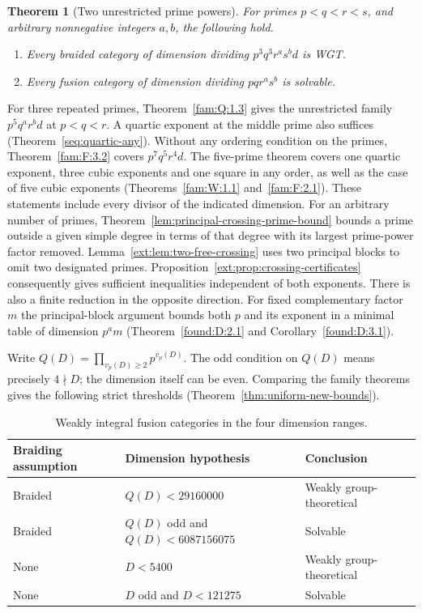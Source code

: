 \documentclass[11pt,a4paper]{article}
\numberwithin{equation}{section}
\newtheorem{theorem}{Theorem}[section]
\theoremstyle{remark}
\begin{document}
\begin{theorem}[Two unrestricted prime powers]\label{thm:intro-two-free}\label{fam:M:1.1}
For primes $p<q<r<s$, and arbitrary nonnegative integers $a,b$, the following hold.
\begin{enumerate}[label=\textup{(\roman*)},leftmargin=*,nosep]
\item Every braided category of dimension dividing $p^3q^3r^as^bd$ is WGT.
\item Every fusion category of dimension dividing $pqr^as^b$ is solvable.
\end{enumerate}
\end{theorem}
For three repeated primes, Theorem~\ref{fam:Q:1.3} gives the unrestricted family $p^5q^a r^bd$ at $p<q<r$. A quartic exponent at the middle prime also suffices (Theorem~\ref{seq:quartic-any}). Without any ordering condition on the primes, Theorem~\ref{fam:F:3.2} covers $p^7q^5r^4d$. The five-prime theorem covers one quartic exponent, three cubic exponents and one square in any order, as well as the case of five cubic exponents (Theorems~\ref{fam:W:1.1} and~\ref{fam:F:2.1}). These statements include every divisor of the indicated dimension. For an arbitrary number of primes, Theorem~\ref{lem:principal-crossing-prime-bound} bounds a prime outside a given simple degree in terms of that degree with its largest prime-power factor removed. Lemma~\ref{ext:lem:two-free-crossing} uses two principal blocks to omit two designated primes. Proposition~\ref{ext:prop:crossing-certificates} consequently gives sufficient inequalities independent of both exponents. There is also a finite reduction in the opposite direction. For fixed complementary factor $m$ the principal-block argument bounds both $p$ and its exponent in a minimal table of dimension $p^a m$ (Theorem~\ref{found:D:2.1} and Corollary~\ref{found:D:3.1}).

Write $Q(D)=\prod_{v_p(D)\ge2}p^{v_p(D)}$. The odd condition on $Q(D)$ means precisely $4\nmid D$; the dimension itself can be even. Comparing the family theorems gives the following strict thresholds (Theorem~\ref{thm:uniform-new-bounds}).
\begin{table}[ht]
\centering\caption{Weakly integral fusion categories in the four dimension ranges.}\label{tab:intro-bounds}
\begin{tabular}{@{}lll@{}}\toprule
Braiding assumption & Dimension hypothesis & Conclusion\\\midrule
Braided & $Q(D)<29160000$ & Weakly group-theoretical\\
Braided & $Q(D)$ odd and $Q(D)<6087156075$ & Solvable\\
None & $D<5400$ & Weakly group-theoretical\\
None & $D$ odd and $D<121275$ & Solvable\\\bottomrule
\end{tabular}
\end{table}
\end{document}
